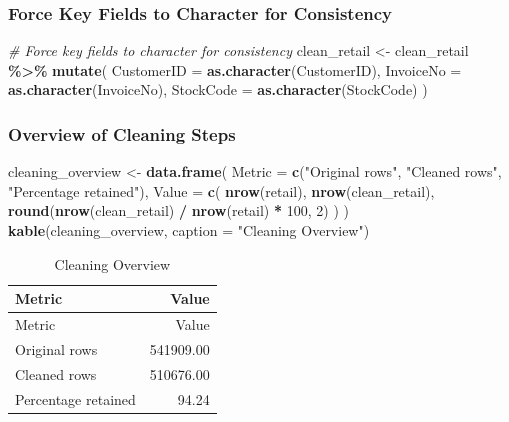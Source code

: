 \documentclass[
]{article}
\newenvironment{Shaded}{\begin{snugshade}}{\end{snugshade}}
\newcommand{\AttributeTok}[1]{\textcolor[rgb]{0.13,0.29,0.53}{#1}}
\newcommand{\CommentTok}[1]{\textcolor[rgb]{0.56,0.35,0.01}{\textit{#1}}}
\newcommand{\DecValTok}[1]{\textcolor[rgb]{0.00,0.00,0.81}{#1}}
\newcommand{\FunctionTok}[1]{\textcolor[rgb]{0.13,0.29,0.53}{\textbf{#1}}}
\newcommand{\NormalTok}[1]{#1}
\newcommand{\OtherTok}[1]{\textcolor[rgb]{0.56,0.35,0.01}{#1}}
\newcommand{\SpecialCharTok}[1]{\textcolor[rgb]{0.81,0.36,0.00}{\textbf{#1}}}
\newcommand{\StringTok}[1]{\textcolor[rgb]{0.31,0.60,0.02}{#1}}
\begin{document}
\subsubsection{Force Key Fields to Character for
Consistency}\label{force-key-fields-to-character-for-consistency}

\begin{Shaded}
\begin{Highlighting}[]
\CommentTok{\# Force key fields to character for consistency}
\NormalTok{clean\_retail }\OtherTok{\textless{}{-}}\NormalTok{ clean\_retail }\SpecialCharTok{\%\textgreater{}\%}
  \FunctionTok{mutate}\NormalTok{(}
    \AttributeTok{CustomerID =} \FunctionTok{as.character}\NormalTok{(CustomerID),}
    \AttributeTok{InvoiceNo =} \FunctionTok{as.character}\NormalTok{(InvoiceNo),}
    \AttributeTok{StockCode =} \FunctionTok{as.character}\NormalTok{(StockCode)}
\NormalTok{  )}
\end{Highlighting}
\end{Shaded}

\subsubsection{Overview of Cleaning
Steps}\label{overview-of-cleaning-steps}

\begin{Shaded}
\begin{Highlighting}[]
\NormalTok{cleaning\_overview }\OtherTok{\textless{}{-}} \FunctionTok{data.frame}\NormalTok{(}
  \AttributeTok{Metric =} \FunctionTok{c}\NormalTok{(}\StringTok{"Original rows"}\NormalTok{, }\StringTok{"Cleaned rows"}\NormalTok{, }\StringTok{"Percentage retained"}\NormalTok{),}
  \AttributeTok{Value =} \FunctionTok{c}\NormalTok{(}
    \FunctionTok{nrow}\NormalTok{(retail),}
    \FunctionTok{nrow}\NormalTok{(clean\_retail),}
    \FunctionTok{round}\NormalTok{(}\FunctionTok{nrow}\NormalTok{(clean\_retail) }\SpecialCharTok{/} \FunctionTok{nrow}\NormalTok{(retail) }\SpecialCharTok{*} \DecValTok{100}\NormalTok{, }\DecValTok{2}\NormalTok{)}
\NormalTok{  )}
\NormalTok{)}
\FunctionTok{kable}\NormalTok{(cleaning\_overview, }\AttributeTok{caption =} \StringTok{"Cleaning Overview"}\NormalTok{)}
\end{Highlighting}
\end{Shaded}

\begin{longtable}[]{@{}lr@{}}
\caption{Cleaning Overview}\tabularnewline
\toprule\noalign{}
Metric & Value \\
\midrule\noalign{}
\endfirsthead
\toprule\noalign{}
Metric & Value \\
\midrule\noalign{}
\endhead
\bottomrule\noalign{}
\endlastfoot
Original rows & 541909.00 \\
Cleaned rows & 510676.00 \\
Percentage retained & 94.24 \\
\end{longtable}
\end{document}
